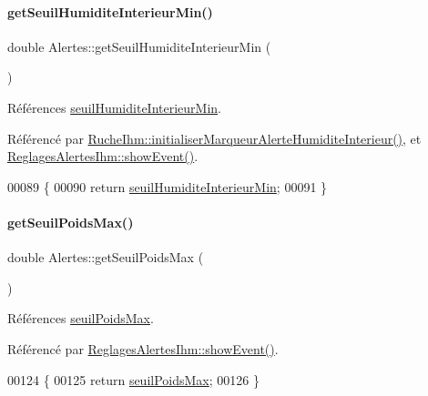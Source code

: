 \paragraph{\texorpdfstring{get\+Seuil\+Humidite\+Interieur\+Min()}{getSeuilHumiditeInterieurMin()}}
{\footnotesize\ttfamily double Alertes\+::get\+Seuil\+Humidite\+Interieur\+Min (\begin{DoxyParamCaption}{ }\end{DoxyParamCaption})}



Références \hyperlink{class_alertes_a501773587c8f2ccd032fe7db9af1f4e2}{seuil\+Humidite\+Interieur\+Min}.



Référencé par \hyperlink{class_ruche_ihm_a42785d6da8aca09d8becb6d500de8d9f}{Ruche\+Ihm\+::initialiser\+Marqueur\+Alerte\+Humidite\+Interieur()}, et \hyperlink{class_reglages_alertes_ihm_af47504b34ab0213fce9269c08b9e5544}{Reglages\+Alertes\+Ihm\+::show\+Event()}.


\begin{DoxyCode}
00089 \{
00090     \textcolor{keywordflow}{return} \hyperlink{class_alertes_a501773587c8f2ccd032fe7db9af1f4e2}{seuilHumiditeInterieurMin};
00091 \}
\end{DoxyCode}
\mbox{\label{class_alertes_a2c19b460f7f7cc7a867b5ed634371878}} 
\paragraph{\texorpdfstring{get\+Seuil\+Poids\+Max()}{getSeuilPoidsMax()}}
{\footnotesize\ttfamily double Alertes\+::get\+Seuil\+Poids\+Max (\begin{DoxyParamCaption}{ }\end{DoxyParamCaption})}



Références \hyperlink{class_alertes_a19b88c68325ccc6e5e8ad11a2537b25e}{seuil\+Poids\+Max}.



Référencé par \hyperlink{class_reglages_alertes_ihm_af47504b34ab0213fce9269c08b9e5544}{Reglages\+Alertes\+Ihm\+::show\+Event()}.


\begin{DoxyCode}
00124 \{
00125     \textcolor{keywordflow}{return} \hyperlink{class_alertes_a19b88c68325ccc6e5e8ad11a2537b25e}{seuilPoidsMax};
00126 \}
\end{DoxyCode}
\mbox{\label{class_alertes_a228829e2826ee20cc014b2eb54addf14}} 

